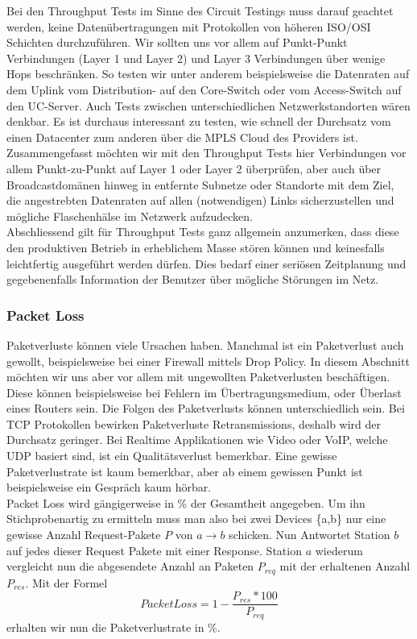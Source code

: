 \documentclass[a4,12pt]{scrartcl}
\begin{document}
\noindent
Bei den Throughput Tests im Sinne des Circuit Testings muss darauf geachtet werden, keine Datenübertragungen mit Protokollen von höheren ISO/OSI Schichten durchzuführen. Wir sollten uns vor allem auf Punkt-Punkt Verbindungen (Layer 1 und Layer 2) und Layer 3 Verbindungen über wenige Hops beschränken. So testen wir unter anderem beispielsweise die Datenraten auf dem Uplink vom Distribution- auf den Core-Switch oder vom Access-Switch auf den UC-Server. Auch Tests zwischen unterschiedlichen Netzwerkstandorten wären denkbar. Es ist durchaus interessant zu testen, wie schnell der Durchsatz vom einen Datacenter zum anderen über die MPLS Cloud des Providers ist. Zusammengefasst möchten wir mit den Throughput Tests hier Verbindungen vor allem Punkt-zu-Punkt auf Layer 1 oder Layer 2 überprüfen, aber auch über Broadcastdomänen hinweg in entfernte Subnetze oder Standorte mit dem Ziel, die angestrebten Datenraten auf allen (notwendigen) Links sicherzustellen und mögliche Flaschenhälse im Netzwerk aufzudecken.\\

\noindent Abschliessend gilt für Throughput Tests ganz allgemein anzumerken, dass diese den produktiven Betrieb in erheblichem Masse stören können und keinesfalls leichtfertig ausgeführt werden dürfen. Dies bedarf einer seriösen Zeitplanung und gegebenenfalls Information der Benutzer über mögliche Störungen im Netz.

\subsubsection{Packet Loss} 
Paketverluste können viele Ursachen haben. Manchmal ist ein Paketverlust auch gewollt, beispielsweise bei einer Firewall mittels Drop Policy. In diesem Abschnitt möchten wir uns aber vor allem mit ungewollten Paketverlusten beschäftigen. Diese können beispielsweise bei Fehlern im Übertragungsmedium, oder Überlast eines Routers sein. Die Folgen des Paketverlusts können unterschiedlich sein. Bei TCP Protokollen bewirken Paketverluste Retransmissions, deshalb wird der Durchsatz geringer. Bei Realtime Applikationen wie Video oder VoIP, welche UDP basiert sind, ist ein Qualitätsverlust bemerkbar. Eine gewisse Paketverlustrate ist kaum bemerkbar, aber ab einem gewissen Punkt ist beispielsweise ein Gespräch kaum hörbar.\\

\noindent Packet Loss wird gängigerweise in \% der Gesamtheit angegeben. Um ihn Stichprobenartig zu ermitteln muss man also bei zwei Devices \{a,b\} nur eine gewisse Anzahl Request-Pakete $P$ von $a \rightarrow b$ schicken. Nun Antwortet Station $b$ auf jedes dieser Request Pakete mit einer Response. Station $a$ wiederum vergleicht nun die abgesendete Anzahl an Paketen $P_{req}$ mit der erhaltenen Anzahl $P_{res}$. 
Mit der Formel
\begin{equation}
Packet Loss = 1-\frac{P_{res} * 100}{P_{req}}
\end{equation}
erhalten wir nun die Paketverlustrate in \%.\\
\end{document}
